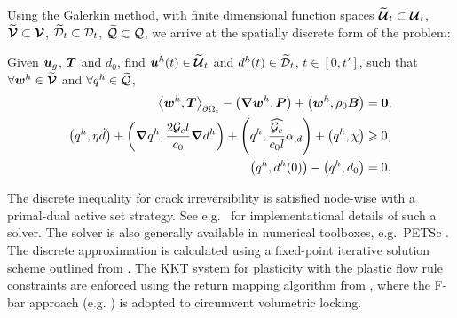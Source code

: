 Using the Galerkin method, with finite dimensional function spaces $\widetilde{\boldsymbol{\mathcal{U}}}_t \subset \boldsymbol{\mathcal{U}}_t$, $\widetilde{\boldsymbol{\mathcal{V}}} \subset \boldsymbol{\mathcal{V}}$, $\widetilde{\mathcal{D}}_t \subset \mathcal{D}_t$, $\widetilde{\mathcal{Q}} \subset \mathcal{Q}$, we arrive at the spatially discrete form of the problem:
\begin{mdframed}[
    frametitle={The Galerkin form},
    frametitlebackgroundcolor=gray!20,
    backgroundcolor=gray!5,
    linewidth=0pt,
    nobreak=true
  ]
  Given $\boldsymbol{u}_g$, $\boldsymbol{T}$ and $d_0$, find $\boldsymbol{u}^h(t) \in \widetilde{\boldsymbol{\mathcal{U}}}_t$ and $d^h(t) \in \widetilde{\mathcal{D}}_t$, $t \in [0, t']$, such that $\forall \boldsymbol{w}^h \in \widetilde{\boldsymbol{\mathcal{V}}}$ and $\forall q^h \in \widetilde{\mathcal{Q}}$,
  \begin{subequations}
    \begin{align}
      \left< \boldsymbol{w}^h, \boldsymbol{T} \right>_{{\partial \Omega}_t} - \left( \boldsymbol{\nabla} \boldsymbol{w}^h, \boldsymbol{P} \right) + \left( \boldsymbol{w}^h, \rho_0 \boldsymbol{B} \right)                                                                 & = \boldsymbol{0},    \label{eq: galerkin mechanics} \\
      \left( q^h, \eta \dot{d} \right) + \left( \boldsymbol{\nabla} q^h, \dfrac{2 {\mathcal{G}_c} l}{c_0} \boldsymbol{\nabla} d^h \right) + \left( q^h, \dfrac{\widehat{{\mathcal{G}_c}}}{c_0 l} \alpha_{, d} \right) + \left( q^h, \chi \right) & \geqslant 0, \label{eq: galerkin damage}    \\
      \left( q^h, d^h(0) \right) - \left( q^h, d_0 \right)                                                                                                                                   & = 0. \label{eq: galerkin bound}
    \end{align}
  \end{subequations}
\end{mdframed}

The discrete inequality for crack irreversibility is satisfied node-wise with a primal-dual active set strategy. See e.g.\  \citet{heister2015primal} for implementational details of such a solver. The solver is also generally available in numerical toolboxes, e.g.\  PETSc \cite{petsc-web-page}. The discrete approximation is calculated using a fixed-point iterative solution scheme outlined from \cite{HuGary2020}. The KKT system for plasticity with the plastic flow rule constraints are enforced using the return mapping algorithm from \cite{borden2016phase}, where the F-bar approach (e.g. \cite{neto2005f}) is adopted to circumvent volumetric locking.
